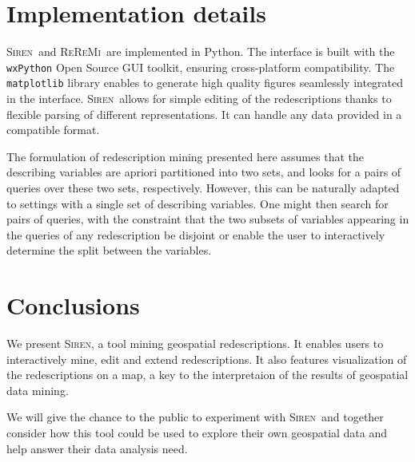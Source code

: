 \documentclass{sig-alternate}
\newcommand{\Siren}{\textsc{Siren}}
\newcommand{\ReReMi}{\textsc{ReReMi}}
\begin{document}
\section{Implementation details}
\Siren\ and \ReReMi\ are implemented in Python.  The interface is built
with the \texttt{wxPython} Open Source GUI toolkit, ensuring
cross-platform compatibility.  The \texttt{matplotlib} library enables
to generate high quality figures seamlessly integrated in the
interface.  \Siren\ allows for simple editing of the redescriptions thanks to flexible parsing of different representations. It can handle any data provided in a compatible
format.

The formulation of redescription mining presented here assumes that
the describing variables are apriori partitioned into two sets, and
looks for a pairs of queries over these two sets, respectively.
However, this can be naturally adapted to settings with a single set
of describing variables.  One might then search for pairs of queries,
with the constraint that the two subsets of variables appearing in the
queries of any redescription be disjoint or enable the user to
interactively determine the split between the variables.

\section{Conclusions}
We present \Siren, a tool mining geospatial
redescriptions. It enables users to interactively mine, edit and extend
redescriptions. It also features visualization of the redescriptions on a map, a key to the interpretaion of the results of geospatial data mining.

We will give the chance to the public to experiment with \Siren\ and
together consider how this tool could be used to explore their own geospatial
data and help answer their data analysis need.


  
\balancecolumns

\end{document}
